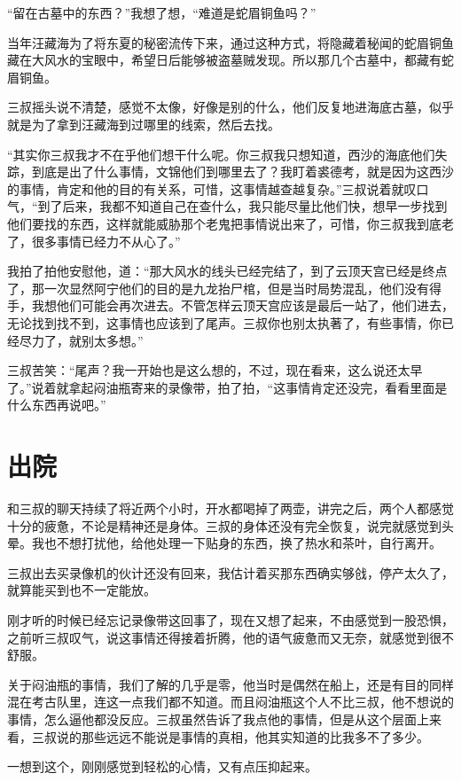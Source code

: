 “留在古墓中的东西？”我想了想，“难道是蛇眉铜鱼吗？”

当年汪藏海为了将东夏的秘密流传下来，通过这种方式，将隐藏着秘闻的蛇眉铜鱼藏在大风水的宝眼中，希望日后能够被盗墓贼发现。所以那几个古墓中，都藏有蛇眉铜鱼。

三叔摇头说不清楚，感觉不太像，好像是别的什么，他们反复地进海底古墓，似乎就是为了拿到汪藏海到过哪里的线索，然后去找。

“其实你三叔我才不在乎他们想干什么呢。你三叔我只想知道，西沙的海底他们失踪，到底是出了什么事情，文锦他们到哪里去了？我盯着裘德考，就是因为这西沙的事情，肯定和他的目的有关系，可惜，这事情越查越复杂。”三叔说着就叹口气，“到了后来，我都不知道自己在查什么，我只能尽量比他们快，想早一步找到他们要找的东西，这样就能威胁那个老鬼把事情说出来了，可惜，你三叔我到底老了，很多事情已经力不从心了。”

我拍了拍他安慰他，道：“那大风水的线头已经完结了，到了云顶天宫已经是终点了，那一次显然阿宁他们的目的是九龙抬尸棺，但是当时局势混乱，他们没有得手，我想他们可能会再次进去。不管怎样云顶天宫应该是最后一站了，他们进去，无论找到找不到，这事情也应该到了尾声。三叔你也别太执著了，有些事情，你已经尽力了，就别太多想。”

三叔苦笑：“尾声？我一开始也是这么想的，不过，现在看来，这么说还太早了。”说着就拿起闷油瓶寄来的录像带，拍了拍，“这事情肯定还没完，看看里面是什么东西再说吧。”

\chapter{出院}

和三叔的聊天持续了将近两个小时，开水都喝掉了两壶，讲完之后，两个人都感觉十分的疲惫，不论是精神还是身体。三叔的身体还没有完全恢复，说完就感觉到头晕。我也不想打扰他，给他处理一下贴身的东西，换了热水和茶叶，自行离开。

三叔出去买录像机的伙计还没有回来，我估计着买那东西确实够戗，停产太久了，就算能买到也不一定能放。

刚才听的时候已经忘记录像带这回事了，现在又想了起来，不由感觉到一股恐惧，之前听三叔叹气，说这事情还得接着折腾，他的语气疲惫而又无奈，就感觉到很不舒服。

关于闷油瓶的事情，我们了解的几乎是零，他当时是偶然在船上，还是有目的同样混在考古队里，连这一点我们都不知道。而且闷油瓶这个人不比三叔，他不想说的事情，怎么逼他都没反应。三叔虽然告诉了我点他的事情，但是从这个层面上来看，三叔说的那些远远不能说是事情的真相，他其实知道的比我多不了多少。

一想到这个，刚刚感觉到轻松的心情，又有点压抑起来。

